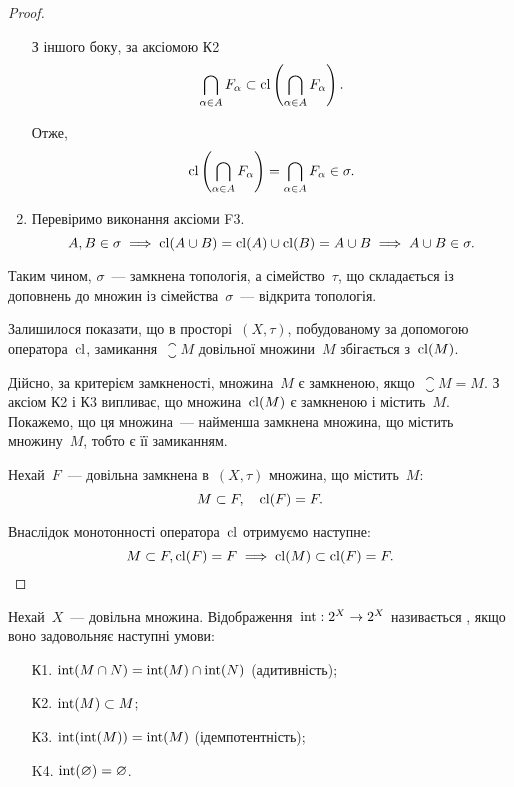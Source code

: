 \begin{proof}
\begin{enumerate}
        З іншого боку, за аксіомою К2 \[ \bigcap_{\alpha \in A} F_\alpha \subset \operatorname{cl} \left(\bigcap_{\alpha \in A} F_\alpha \right). \]

        Отже, \[ \operatorname{cl} \left(\bigcap_{\alpha \in A} F_\alpha \right) = \bigcap_{\alpha \in A} F_\alpha \in \sigma. \]

        \item Перевіримо виконання аксіоми F3. \[A, B \in \sigma \implies \operatorname{cl}(A\cup B) = \operatorname{cl}(A)\cup \operatorname{cl}(B) = A\cup B \implies A\cup B\in\sigma.\]
    \end{enumerate}

    Таким чином, $\sigma$~--- замкнена топологія, а сімейство~$\tau$, що складається із доповнень до множин із сімейства~$\sigma$~--- відкрита топологія.

    Залишилося показати, що в просторі~$(X, \tau)$, побудованому за допомогою оператора~$\operatorname{cl}$, замикання~$\closure{M}$ довільної множини~$M$ збігається з~$\operatorname{cl}(M)$.

    Дійсно, за критерієм замкненості, множина~$M$ є замкненою, якщо~$\closure{M} = M$. З аксіом К2 і К3 випливає, що множина~$\operatorname{cl}(M)$ є замкненою і містить~$M$. Покажемо, що ця множина~--- найменша замкнена множина, що містить множину~$M$, тобто є її замиканням.

    Нехай~$F$~--- довільна замкнена в~$(X, \tau)$ множина, що містить~$M$: \[ M \subset F, \quad \operatorname{cl}(F) = F. \]

    Внаслідок монотонності оператора~$\operatorname{cl}$ отримуємо наступне: \[ M \subset F, \operatorname{cl}(F) = F \implies \operatorname{cl}(M) \subset \operatorname{cl}(F) = F. \qedhere \]
\end{proof}

\begin{definition}
    Нехай~$X$~--- довільна множина. Відображення~$\operatorname{int}: 2^X \to 2^X$ називається , якщо воно задовольняє наступні умови:
    \begin{enumerate}
        \item[К1.] $\operatorname{int}(M \cap N) = \operatorname{int}(M)\cap \operatorname{int}(N)$ (адитивність);
        \item[К2.] $\operatorname{int}(M) \subset M$;
        \item[К3.] $\operatorname{int}(\operatorname{int}(M)) = \operatorname{int}(M)$ (ідемпотентність);
        \item[K4.] $\operatorname{int}(\varnothing) = \varnothing$.
    \end{enumerate}
\end{definition}

